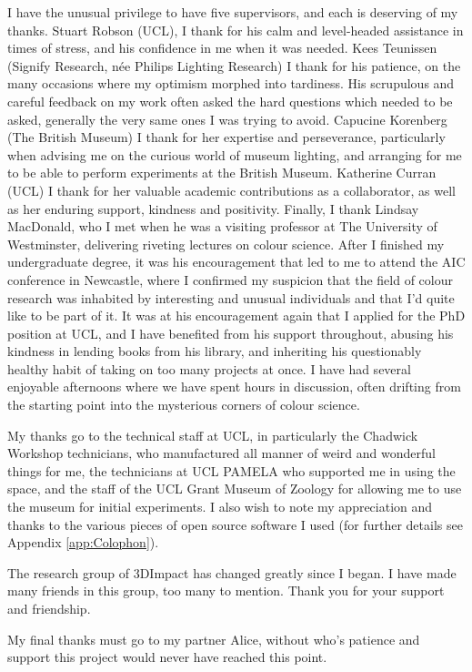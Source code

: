 \begin{acknowledgements}
I have the unusual privilege to have five supervisors, and each is deserving of my thanks. Stuart Robson (\gls{UCL}), I thank for his calm and level-headed assistance in times of stress, and his confidence in me when it was needed. Kees Teunissen (Signify Research, née Philips Lighting Research) I thank for his patience, on the many occasions where my optimism morphed into tardiness. His scrupulous and careful feedback on my work often asked the hard questions which needed to be asked, generally the very same ones I was trying to avoid. Capucine Korenberg (The British Museum) I thank for her expertise and perseverance, particularly when advising me on the curious world of museum lighting, and arranging for me to be able to perform experiments at the British Museum.
Katherine Curran (\gls{UCL}) I thank for her valuable academic contributions as a collaborator, as well as her enduring support, kindness and positivity.
Finally, I thank Lindsay MacDonald, who I met when he was a visiting professor at The University of Westminster, delivering riveting lectures on colour science. After I finished my undergraduate degree, it was his encouragement that led to me to attend the AIC conference in Newcastle, where I confirmed my suspicion that the field of colour research was inhabited by interesting and unusual individuals and that I'd quite like to be part of it. It was at his encouragement again that I applied for the PhD position at \gls{UCL}, and I have benefited from his support throughout, abusing his kindness in lending books from his library, and inheriting his questionably healthy habit of taking on too many projects at once. I have had several enjoyable afternoons where we have spent hours in discussion, often drifting from the starting point into the mysterious corners of colour science.

My thanks go to the technical staff at \gls{UCL}, in particularly the Chadwick Workshop technicians, who manufactured all manner of weird and wonderful things for me, the technicians at \gls{UCL} \acrshort{PAMELA} who supported me in using the space, and the staff of the \gls{UCL} Grant Museum of Zoology for allowing me to use the museum for initial experiments. I also wish to note my appreciation and thanks to the various pieces of open source software I used (for further details see Appendix \ref{app:Colophon}).

The research group of 3DImpact has changed greatly since I began. I have made many friends in this group, too many to mention. Thank you for your support and friendship.

My final thanks must go to my partner Alice, without who's patience and support this project would never have reached this point.

\end{acknowledgements}